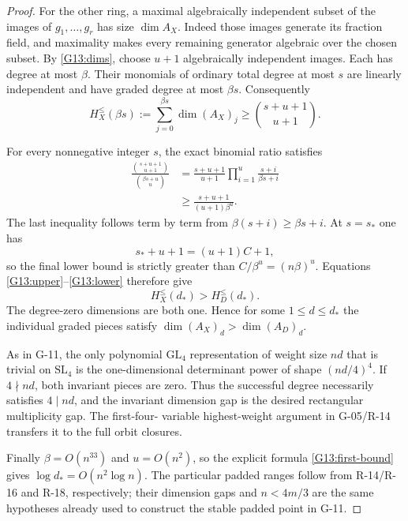 \begin{proof}
For the other ring, a maximal algebraically independent
subset of the images of $g_1,\ldots,g_r$ has size
$\dim A_X$. Indeed those images generate its fraction
field, and maximality makes every remaining generator
algebraic over the chosen subset. By \eqref{G13:dims},
choose $u+1$ algebraically independent images. Each has
degree at most $\beta$. Their monomials of ordinary total
degree at most $s$ are linearly independent and have
graded degree at most $\beta s$. Consequently
\begin{equation}\label{G13:lower}
 H_X^{\leq}(\beta s)
 :=\sum_{j=0}^{\beta s}\dim(A_X)_j
 \geq\binom{s+u+1}{u+1}.
\end{equation}

For every nonnegative integer $s$, the exact binomial ratio
satisfies
\begin{align*}
 \frac{\binom{s+u+1}{u+1}}{\binom{\beta s+u}{u}}
 &=\frac{s+u+1}{u+1}
     \prod_{i=1}^u\frac{s+i}{\beta s+i}\\
 &\geq\frac{s+u+1}{(u+1)\beta^u}.
\end{align*}
The last inequality follows term by term from
$\beta(s+i)\geq\beta s+i$. At $s=s_*$ one has
\[
 s_*+u+1=(u+1)C+1,
\]
so the final lower bound is strictly greater than
$C/\beta^u=(n\beta)^u$. Equations
\eqref{G13:upper}--\eqref{G13:lower} therefore give
\[
 H_X^{\leq}(d_*)>H_D^{\leq}(d_*).
\]
The degree-zero dimensions are both one. Hence for some
$1\leq d\leq d_*$ the individual graded pieces satisfy
$\dim(A_X)_d>\dim(A_D)_d$.

As in G-11, the only polynomial $\mathrm{GL}_4$
representation of weight size $nd$ that is trivial on
$\mathrm{SL}_4$ is the one-dimensional determinant power
of shape $(nd/4)^4$. If $4\nmid nd$, both invariant
pieces are zero. Thus the successful degree necessarily
satisfies $4\mid nd$, and the invariant dimension gap is
the desired rectangular multiplicity gap. The first-four-
variable highest-weight argument in G-05/R-14 transfers
it to the full orbit closures.

Finally $\beta=O(n^{33})$ and $u=O(n^2)$, so the explicit
formula \eqref{G13:first-bound} gives
$\log d_*=O(n^2\log n)$. The particular padded ranges
follow from R-14/R-16 and R-18, respectively; their
dimension gaps and $n<4m/3$ are the same hypotheses already
used to construct the stable padded point in G-11.
\end{proof}
